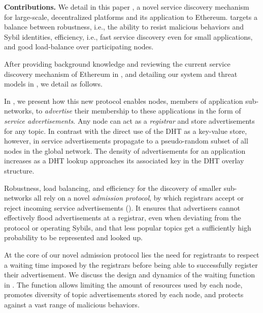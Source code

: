 \smallskip
\noindent
\textbf{Contributions.}
%
We detail in this paper \sysname, a novel service discovery mechanism for large-scale, decentralized platforms and its application to Ethereum.
\sysname targets a balance between robustness, i.e., the ability to resist malicious behaviors and Sybil identities, efficiency, i.e., fast service discovery even for small applications, and good load-balance over participating nodes.

After providing background knowledge and reviewing the current service discovery mechanism of Ethereum in , and detailing our system and threat models in , we detail \sysname as follows.

In , we present how this new protocol enables nodes, members of application sub-networks, to \emph{advertise} their membership to these applications in the form of \emph{service advertisements}.
Any node can act as a \emph{registrar} and store advertisements for any topic.
In contrast with the direct use of the DHT as a key-value store, however, in \sysname service advertisements propagate to a pseudo-random subset of all nodes in the global network.
The density of advertisements for an application increases as a DHT lookup approaches its associated key in the DHT overlay structure.

Robustness, load balancing, and efficiency for the discovery of smaller sub-networks all rely on a novel \emph{admission protocol}, by which registrars accept or reject incoming service advertisements ().
It ensures that advertisers cannot effectively flood advertisements at a registrar, even when deviating from the protocol or operating Sybils, and that less popular topics get a sufficiently high probability to be represented and looked up.

At the core of our novel admission protocol lies the need for registrants to respect a waiting time imposed by the registrars before being able to successfully register their advertisement.
We discuss the design and dynamics of the waiting function in .
The function allows limiting the amount of resources used by each node, promotes diversity of topic advertisements stored by each node, and protects against a vast range of malicious behaviors.

